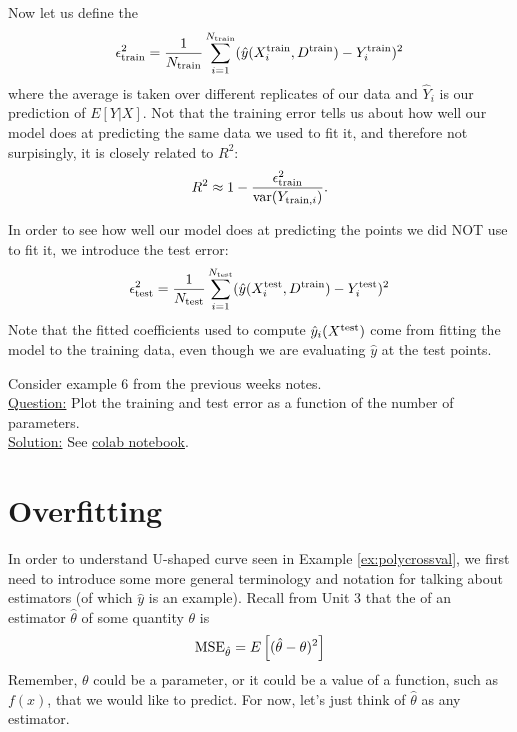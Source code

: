 Now let us define the 
\begin{equation*}
\epsilon_{\rm train}^2=  \frac{1}{N_{\rm train}}\sum_{i=1}^{N_{\rm train}}(\hat{y}(X_i^{\rm train},D^{\rm train}) - Y_i^{\rm train})^2
\end{equation*}
where the average is taken over different replicates of our data and $\hat{Y}_i$ is our prediction of $E[Y|X]$. Not that the training error tells us about how well our model does at predicting the same data we used to fit it, and therefore not surpisingly, it is closely related to $R^2$:
\begin{equation*}
R^2 \approx 1 - \frac{\epsilon_{\rm train}^2}{{\rm var}(Y_{{\rm train},i})}.
\end{equation*}

In order to see how well our model does at predicting the points we did NOT use to fit it, we introduce the test error: 
\begin{equation*}
\epsilon_{\rm test}^2=  \frac{1}{N_{\rm test}}\sum_{i=1}^{N_{\rm test}}(\hat{y}(X_i^{\rm test},D^{\rm train}) - Y_i^{\rm test})^2
\end{equation*}
Note that the fitted coefficients used to compute $\hat{y}_i(X^{\rm test})$ come from fitting the model to the training data, even though we are evaluating $\hat{y}$ at the test points. 

\begin{example}\label{ex:polycrossval}
Consider example 6 from the previous weeks notes. \\

\noindent
\underline{Question:} Plot the training and test error as a function of the number of parameters. \\

\noindent
\underline{Solution:}  See \href{https://colab.research.google.com/drive/1EYcMviowfsnsVe7vsUKlyzkNsddUiTau?usp=sharing}{colab notebook}.
\end{example}

\section{Overfitting}
 In order to understand U-shaped curve seen in Example \ref{ex:polycrossval},  we first need to introduce some more general terminology and notation for talking about estimators (of which $\hat{y}$ is an example). 
Recall from Unit 3 that the  of an estimator $\hat{\theta}$ of some quantity $\theta$ is 
\begin{equation}\label{eq:mse}
{\rm MSE}_{\hat{\theta}}= E\left[(\hat{\theta}- \theta)^2\right]
\end{equation}
Remember, $\theta$ could be a parameter, or it could be a value of a function, such as $f(x)$, that we would like to predict. 
For now, let's just think of $\hat{\theta}$ as any estimator. 

